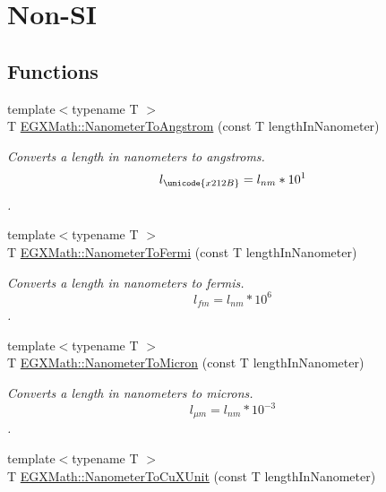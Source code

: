 \hypertarget{group___e_g_x_math-_conversions-_length_conversions-_s_i-_nanometer-_non-_s_i}{}\section{Non-\/\+SI}
\label{group___e_g_x_math-_conversions-_length_conversions-_s_i-_nanometer-_non-_s_i}
\subsection*{Functions}
\begin{DoxyCompactItemize}
\item 
{\footnotesize template$<$typename T $>$ }\\T \mbox{\hyperlink{group___e_g_x_math-_conversions-_length_conversions-_s_i-_nanometer-_non-_s_i_ga7e2062d4cc1a422e54da597c4413efb1}{E\+G\+X\+Math\+::\+Nanometer\+To\+Angstrom}} (const T length\+In\+Nanometer)
\begin{DoxyCompactList}\small\item\em Converts a length in nanometers to angstroms. \[ l_{\unicode{x212B}}=l_{nm} * 10^{1} \]. \end{DoxyCompactList}\item 
{\footnotesize template$<$typename T $>$ }\\T \mbox{\hyperlink{group___e_g_x_math-_conversions-_length_conversions-_s_i-_nanometer-_non-_s_i_ga9b708f83b519464f5ebb912bcaaf747d}{E\+G\+X\+Math\+::\+Nanometer\+To\+Fermi}} (const T length\+In\+Nanometer)
\begin{DoxyCompactList}\small\item\em Converts a length in nanometers to fermis. \[ l_{fm}=l_{nm} * 10^{6} \]. \end{DoxyCompactList}\item 
{\footnotesize template$<$typename T $>$ }\\T \mbox{\hyperlink{group___e_g_x_math-_conversions-_length_conversions-_s_i-_nanometer-_non-_s_i_ga278b008cafd5027568e16cbc8af7fb6a}{E\+G\+X\+Math\+::\+Nanometer\+To\+Micron}} (const T length\+In\+Nanometer)
\begin{DoxyCompactList}\small\item\em Converts a length in nanometers to microns. \[ l_{\mu m}=l_{nm} * 10^{-3} \]. \end{DoxyCompactList}\item 
{\footnotesize template$<$typename T $>$ }\\T \mbox{\hyperlink{group___e_g_x_math-_conversions-_length_conversions-_s_i-_nanometer-_non-_s_i_ga59399657caa5a9c81df2ffbe1ff7683c}{E\+G\+X\+Math\+::\+Nanometer\+To\+Cu\+X\+Unit}} (const T length\+In\+Nanometer)

\end{DoxyCompactItemize}
